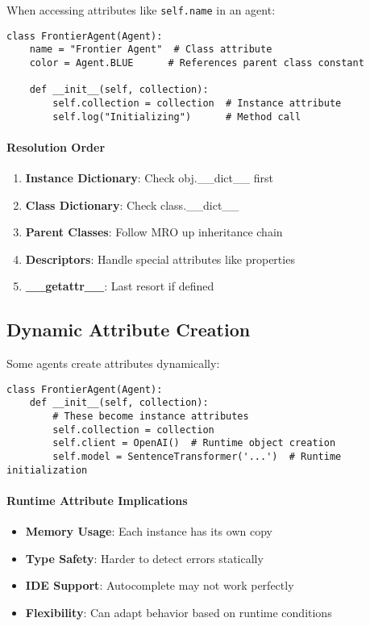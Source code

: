 When accessing attributes like \texttt{self.name} in an agent:

\begin{lstlisting}[caption=Attribute Resolution Example]
class FrontierAgent(Agent):
    name = "Frontier Agent"  # Class attribute
    color = Agent.BLUE      # References parent class constant
    
    def __init__(self, collection):
        self.collection = collection  # Instance attribute
        self.log("Initializing")      # Method call
\end{lstlisting}

\paragraph{Resolution Order}
\begin{enumerate}
\item \textbf{Instance Dictionary}: Check obj.\_\_dict\_\_ first
\item \textbf{Class Dictionary}: Check class.\_\_dict\_\_ 
\item \textbf{Parent Classes}: Follow MRO up inheritance chain
\item \textbf{Descriptors}: Handle special attributes like properties
\item \textbf{\_\_getattr\_\_}: Last resort if defined
\end{enumerate}

\subsection{Dynamic Attribute Creation}

Some agents create attributes dynamically:

\begin{lstlisting}[caption=Dynamic Attribute Example]
class FrontierAgent(Agent):
    def __init__(self, collection):
        # These become instance attributes
        self.collection = collection
        self.client = OpenAI()  # Runtime object creation
        self.model = SentenceTransformer('...')  # Runtime initialization
\end{lstlisting}

\paragraph{Runtime Attribute Implications}
\begin{itemize}
\item \textbf{Memory Usage}: Each instance has its own copy
\item \textbf{Type Safety}: Harder to detect errors statically
\item \textbf{IDE Support}: Autocomplete may not work perfectly
\item \textbf{Flexibility}: Can adapt behavior based on runtime conditions
\end{itemize}

